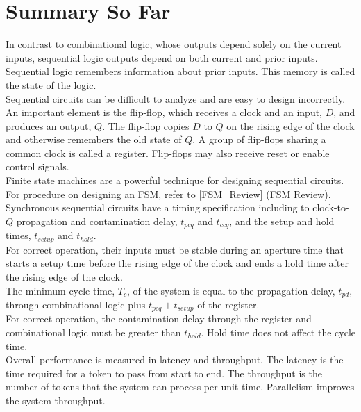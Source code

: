 \documentclass[12pt]{article}
\theoremstyle{definition}
\begin{document}
  \section{Summary So Far}
  In contrast to combinational logic, whose outputs depend solely on the current inputs, sequential logic outputs depend on both current and prior inputs.
  Sequential logic remembers information about prior inputs.
  This memory is called the state of the logic. \\

  Sequential circuits can be difficult to analyze and are easy to design incorrectly.
  An important element is the flip-flop, which receives a clock and an input, $D$, and produces an output, $Q$.
  The flip-flop copies $D$ to $Q$ on the rising edge of the clock and otherwise remembers the old state of $Q$.
  A group of flip-flops sharing a common clock is called a register.
  Flip-flops may also receive reset or enable control signals. \\

  Finite state machines are a powerful technique for designing sequential circuits.
  For procedure on designing an FSM, refer to \ref{FSM_Review} (FSM Review). \\

  Synchronous sequential circuits have a timing specification including to clock-to-$Q$ propagation and contamination delay, $t_{pcq}$ and $t_{ccq}$, and the setup and hold times, $t_{setup}$ and $t_{hold}$. \\
  For correct operation, their inputs must be stable during an aperture time that starts a setup time before the rising edge of the clock and ends a hold time after the rising edge of the clock. \\

  The minimum cycle time, $T_{c}$, of the system is equal to the propagation delay, $t_{pd}$, through combinational logic plus $t_{pcq} + t_{setup}$ of the register. \\
  For correct operation, the contamination delay through the register and combinational logic must be greater than $t_{hold}$.
  Hold time does not affect the cycle time. \\

  Overall performance is measured in latency and throughput.
  The latency is the time required for a token to pass from start to end.
  The throughput is the number of tokens that the system can process per unit time.
  Parallelism improves the system throughput.
\end{document}

